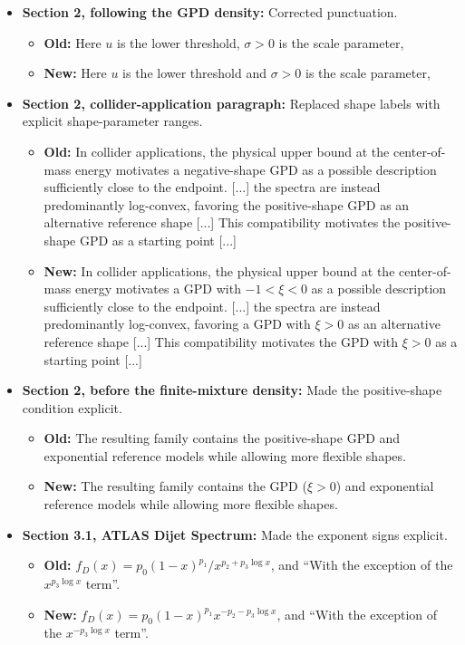 \documentclass[11pt,a4paper]{article}
\begin{document}
\begin{itemize}
    \item \textbf{Section 2, following the GPD density:} Corrected punctuation.
    \begin{itemize}
        \item \textbf{Old:} Here $u$ is the lower threshold, $\sigma>0$ is the scale parameter,
        \item \textbf{New:} Here $u$ is the lower threshold and $\sigma>0$ is the scale parameter,
    \end{itemize}

    \item \textbf{Section 2, collider-application paragraph:} Replaced shape labels with explicit shape-parameter ranges.
    \begin{itemize}
        \item \textbf{Old:} In collider applications, the physical upper bound at the center-of-mass energy motivates a negative-shape GPD as a possible description sufficiently close to the endpoint. [...] the spectra are instead predominantly log-convex, favoring the positive-shape GPD as an alternative reference shape [...] This compatibility motivates the positive-shape GPD as a starting point [...]
        \item \textbf{New:} In collider applications, the physical upper bound at the center-of-mass energy motivates a GPD with $-1<\xi<0$ as a possible description sufficiently close to the endpoint. [...] the spectra are instead predominantly log-convex, favoring a GPD with $\xi>0$ as an alternative reference shape [...] This compatibility motivates the GPD with $\xi>0$ as a starting point [...]
    \end{itemize}

    \item \textbf{Section 2, before the finite-mixture density:} Made the positive-shape condition explicit.
    \begin{itemize}
        \item \textbf{Old:} The resulting family contains the positive-shape GPD and exponential reference models while allowing more flexible shapes.
        \item \textbf{New:} The resulting family contains the GPD ($\xi>0$) and exponential reference models while allowing more flexible shapes.
    \end{itemize}

    \item \textbf{Section 3.1, ATLAS Dijet Spectrum:} Made the exponent signs explicit.
    \begin{itemize}
        \item \textbf{Old:} $f_D(x) = p_0(1-x)^{p_1}/x^{p_2+p_3\log x}$, and ``With the exception of the $x^{p_3\log x}$ term''.
        \item \textbf{New:} $f_D(x) = p_0(1-x)^{p_1}x^{-p_2-p_3\log x}$, and ``With the exception of the $x^{-p_3\log x}$ term''.
    \end{itemize}


\end{itemize}
\end{document}

